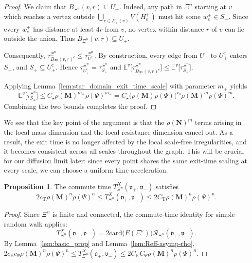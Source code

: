 \documentclass{article}
\theoremstyle{plain}
\theoremstyle{definition}
\newtheorem{proposition}[theorem]{Proposition}
\newcommand{\card}{\mathrm{card}}
\newcommand{\Reff}{\mathscr{R}}
\begin{document}
\begin{proof}
We claim that $B_{\Xi^n}(v,r)\subseteq U_+$.
Indeed, any path in $\Xi^n$ starting at $v$ which reaches a vertex outside $\bigcup_{e\in E_+(v)}V(H_e^+)$ must hit some $w_e^+\in S_+$.
Since every $w_e^+$ has distance at least $4r$ from $v$, no vertex within distance $r$ of $v$ can lie outside the union.
Thus $B_{\Xi^n}(v,r)\subseteq U_+$.

Consequently,
$
\tau_{B_{\Xi^n}(v,r)^{\mathrm c}}^{\Xi^n}\le \tau_{U_+^{\mathrm c}}^{\Xi^n}.
$
By construction, every edge from $U_+$ to $U_+^{\mathrm c}$ enters $S_+$, and $S_+\subseteq U_+^{\mathrm c}$.
Hence $\tau_{U_+^{\mathrm c}}^{\Xi^n}=\tau_{S_+}^{\Xi^n}$ and
$
\mathbb E^v\big[\tau_{B_{\Xi^n}(v,r)^{\mathrm c}}^{\Xi^n}\big]
\le
\mathbb E^v\big[\tau_{S_+}^{\Xi^n}\big].
$

Applying Lemma~\ref{lem:star_domain_exit_time_scale} with parameter $m_+$ yields
\[
\mathbb E^v\big[\tau_{S_+}^{\Xi^n}\big]
\le
C_{\star}\rho(\mathbf M)^{m_+}\rho(\Psi)^{m_+}
=
C_{\star}\big(\rho(\mathbf M)\rho(\Psi)\big)^{c_0}\rho(\mathbf M)^m\rho(\Psi)^m.
\]
Combining the two bounds completes the proof.
\end{proof}

We see that the key point of the argument is that the $\rho(\mathbf N)^m$ terms arising in the local mass dimension and the local resistance dimension cancel out.
As a result, the exit time is no longer affected by the local scale-free irregularities, and it becomes consistent across all scales throughout the graph.
This will be crucial for our diffusion limit later: since every point shares the same exit-time scaling at every scale, we can choose a uniform time acceleration.

\begin{proposition}\label{lem:commute-time-eigs-asymp}
The commute time $T_{\Xi^n}^X(\mathfrak v_+,\mathfrak v_-)$ satisfies
\[
2 c_{\mathrm T} \rho(\mathbf M)^n \rho(\Psi)^n
\le
T_{\Xi^n}^X(\mathfrak v_+,\mathfrak v_-)
\le
2 C_{\mathrm T} \rho(\mathbf M)^n \rho(\Psi)^n.
\]
\end{proposition}

\begin{proof}
Since $\Xi^n$ is finite and connected, the commute-time identity for simple random walk applies:
\[
T_{\Xi^n}^X(\mathfrak v_+,\mathfrak v_-)
=
2 \card\big(E(\Xi^n)\big) \Reff_{\Xi^n}(\mathfrak v_+,\mathfrak v_-).
\]
By Lemma~\ref{lem:basic_prop} and Lemma~\ref{lem:Reff-asymp-rho},
$
2c_{\mathrm E}c_{\Psi}\rho(\mathbf M)^n\rho(\Psi)^n
\le
T_{\Xi^n}^X(\mathfrak v_+,\mathfrak v_-)
\le
2C_{\mathrm E}C_{\Psi}\rho(\mathbf M)^n\rho(\Psi)^n.
$
\end{proof}
\end{document}
